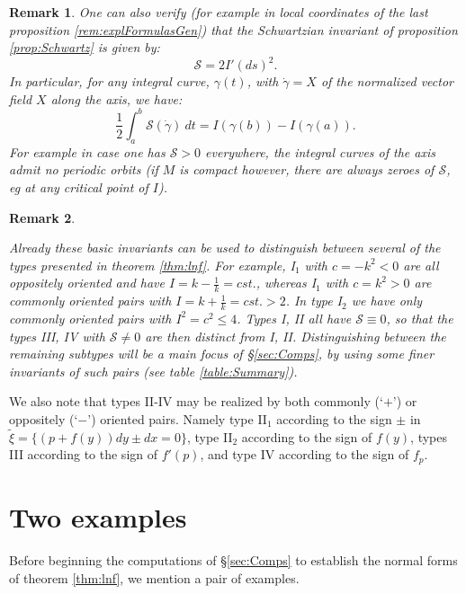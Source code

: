 \documentclass[10pt]{amsart}
\theoremstyle{definition}
\newtheorem{rem}{Remark}
\begin{document}
\begin{rem}
     {\em One can also verify (for example in local coordinates of the last proposition \ref{rem:explFormulasGen}) that the Schwartzian invariant of proposition \ref{prop:Schwartz} is given by: 
\begin{equation}\label{eq:SchwartzI'}
    \mathcal{S} = 2I' (ds)^2.
\end{equation} 
In particular, for any integral curve, $\gamma(t)$, with $\dot\gamma = X$ of the normalized vector field $X$ along the axis, we have:
\[ \frac12 \int_{a}^{b} \mathcal{S}(\dot\gamma)~dt = I(\gamma(b)) - I(\gamma(a)). \]
For example in case one has $\mathcal{S} > 0$ everywhere, the integral curves of the axis admit {\em no} periodic orbits (if $M$ is compact however, there are always zeroes of $\mathcal{S}$, eg at any critical point of $I$).}
\end{rem}


\begin{rem}\label{rem:DistBasic}
    {\em Already these basic invariants can be used to distinguish between several of the types presented in theorem \ref{thm:lnf}. For example, I$_1$ with $c = -k ^2 <0$ are all oppositely oriented and have $I = k - \frac{1}{k} = cst.$, whereas I$_1$ with $c = k^2 > 0$ are commonly oriented pairs with $I = k + \frac{1}{k} = cst. > 2$. In type I$_2$ we have {\em only commonly oriented pairs} with $I^2 = c^2 \le 4$. Types I, II all have $\mathcal{S}\equiv 0$, so that the types III, IV with $\mathcal{S}\ne 0$ are then distinct from I, II. Distinguishing between the remaining subtypes will be a main focus of \S \ref{sec:Comps}, by using some finer invariants of such pairs (see table \ref{table:Summary}).
    
    We also note that types II-IV may be realized by both commonly (`$+$') or oppositely (`$-$') oriented pairs. Namely type II$_1$ according to the sign $\pm$ in $\tilde\xi = \{ (p + f(y))dy \pm dx = 0\}$, type II$_2$ according to the sign of $f(y)$, types III according to the sign of $f'(p)$, and type IV according to the sign of $f_p$.}
\end{rem}






\section{Two examples}\label{sec:Exs}

Before beginning the computations of \S \ref{sec:Comps} to establish the normal forms of theorem \ref{thm:lnf}, we mention a pair of examples.
\end{document}

